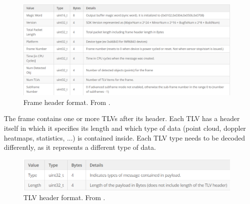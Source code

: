 \begin{figure}[!htbp]
    \centering
    \includegraphics[width=1.0\linewidth]{images/FrameFormatHeader.png}
    \caption{Frame header format. From \cite{mmwave_demo_output}.}
    \label{fig:Frame header format}
\end{figure}
\FloatBarrier\noindent
The frame contains one or more TLVs after its header.
Each TLV has a header itself in which it specifies its length and which type of data (point cloud, doppler heatmaps, statistics, ...) is contained inside.
Each TLV type needs to be decoded differently, as it represents a different type of data.
\begin{figure}[!htbp]
    \centering
    \includegraphics[width=0.95\linewidth]{images/TLVHeader.png}
    \caption{TLV header format. From \cite{mmwave_demo_output}.}
    \label{fig:TLV header format}
\end{figure}
\FloatBarrier

